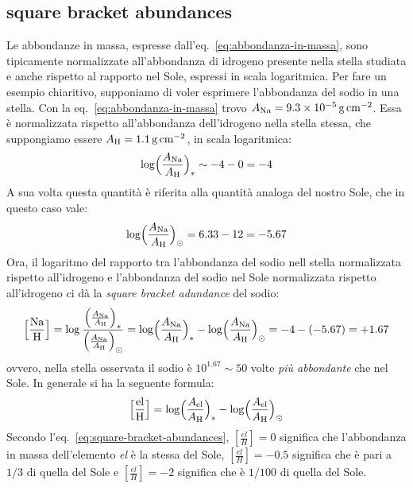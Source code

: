 \subsection{square bracket abundances}
Le abbondanze in massa, espresse dall'eq.~\eqref{eq:abbondanza-in-massa}, sono tipicamente normalizzate all'abbondanza di idrogeno presente nella stella studiata e anche rispetto al rapporto nel Sole, espressi in scala logaritmica. Per fare un esempio chiaritivo, supponiamo di voler esprimere l'abbondanza del sodio in una stella. Con la eq.~\eqref{eq:abbondanza-in-massa} trovo $A_\textup{Na} = \SI{9.3e-5}{g.cm^{-2}}$. Essa è normalizzata rispetto all'abbondanza dell'idrogeno nella stella stessa, che suppongiamo essere $A_\textup{H} = \SI{1.1}{g.cm^{-2}}$, in scala logaritmica:
\[
\log \Bigl( \dfrac{A_\textup{Na}}{A_\textup{H}} \Bigr)_* \sim -4 -0 = -4    
\]
A sua volta questa quantità è riferita alla quantità analoga del nostro Sole, che in questo caso vale:
\[
    \log \Bigl( \dfrac{A_\textup{Na}}{A_\textup{H}} \Bigr)_\odot = 6.33 - 12 = -5.67
\]
Ora, il logaritmo del rapporto tra l'abbondanza del sodio nell stella normalizzata rispetto all'idrogeno e l'abbondanza del sodio nel Sole normalizzata rispetto all'idrogeno ci dà la \emph{square bracket adundance} del sodio:
\[
\Bigl[ \dfrac{\textup{Na}}{\textup{H}} \Bigr] = \log \dfrac{\Bigl(\frac{A_\textup{Na}}{A_\textup{H}}\Bigr)_*}{\Bigl(\frac{A_\textup{Na}}{A_\textup{H}}\Bigr)_\odot} = \log \Bigl( \dfrac{A_\textup{Na}}{A_\textup{H}} \Bigr)_* - \log \Bigl( \dfrac{A_\textup{Na}}{A_\textup{H}} \Bigr)_\odot = -4 -(-5.67) = +1.67
\]
ovvero, nella stella osservata il sodio è $10^{1.67} \sim 50$ volte \emph{più abbondante} che nel Sole. In generale si ha la seguente formula:
\begin{equation}\label{eq:square-bracket-abundances}
    \Bigl[ \dfrac{\textup{el}}{\textup{H}} \Bigr] = \log \Bigl( \dfrac{A_\textup{el}}{A_\textup{H}} \Bigr)_* - \log \Bigl( \dfrac{A_\textup{el}}{A_\textup{H}} \Bigr)_\odot
\end{equation}
Secondo l'eq.~\eqref{eq:square-bracket-abundances}, $[\frac{el}{H}] = 0$ significa che l'abbondanza in massa dell'elemento \emph{el} è la stessa del Sole, $[\frac{el}{H}] = -0.5$ significa che è pari a $1/3$ di quella del Sole e $[\frac{el}{H}] = -2$ significa che è $1/100$ di quella del Sole.